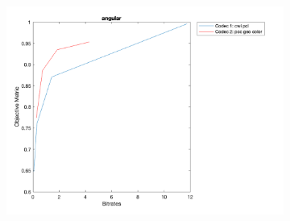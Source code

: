 \documentclass{article}
\begin{document}
\begin{figure}
    \begin{subfigure}[b]{0.65\textwidth}
    \includegraphics[width=\textwidth]{Figures/task2/longdress_angular.png}
    \end{subfigure}
\end{figure}
\end{document}
